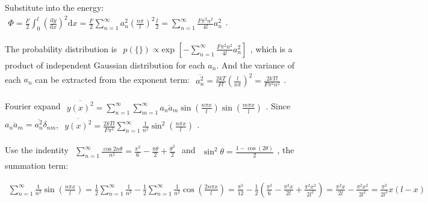 \documentclass[../../main.tex]{subfiles}
\begin{document}
  Substitute into the energy: $\begin{aligned}
    \Phi = \frac{F}{2}\int_{0}^{l}\left(\frac{\mathrm{d}y}{\mathrm{d}x}\right)^{2}\mathrm{d}x = \frac{F}{2}\sum_{n=1}^{\infty}a_{n}^{2}\left(\frac{n\pi}{l}\right)^{2}\frac{l}{2} = \sum_{n=1}^{\infty}\frac{F\pi^{2}n^{2}}{4l}a_{n}^{2}
  \end{aligned}$.

  The probability distribution is $\begin{aligned}
    p(\{\}) \propto \text{exp }\left[-\sum_{n=1}^{\infty}\frac{F\pi^{2}n^{2}}{4l}a_{n}^{2}\right]
  \end{aligned}$, which is a product of independent Gaussian distribution for each $a_{n}$. And the variance of each $a_{n}$ can be extracted from the exponent term: $\begin{aligned}
    \overline{a_{n}^{2}} = \frac{2kT}{Fl}\left(\frac{l}{n\pi}\right)^{2} = \frac{2kTl}{F\pi^{2}n^{2}}
  \end{aligned}$.

  Fourier expand $\begin{aligned}
    \overline{y(x)^{2}} = \sum_{n=1}^{\infty}\sum_{m=1}^{\infty}\overline{a_{n}a_{m}}\sin{\left(\frac{n\pi x}{l}\right)}\sin{\left(\frac{m\pi x}{l}\right)}
  \end{aligned}$. Since $\overline{a_{n}a_{m}} = \overline{a_{n}^{2}}\delta_{nm}$, $\begin{aligned}
    \overline{y(x)^{2}} = \frac{2kTl}{F\pi^{2}}\sum_{n=1}^{\infty}\frac{1}{n^{2}}\sin^{2}{\left(\frac{n\pi x}{l}\right)}
  \end{aligned}$. 

  Use the indentity $\begin{aligned}
    \sum_{n=1}^{\infty}\frac{\cos{2n\theta}}{n^{2}} = \frac{\pi^{2}}{6} - \frac{\pi\theta}{2} + \frac{\theta^{2}}{2}
  \end{aligned}$ and $\begin{aligned}
    \sin^{2}{\theta} = \frac{1-\cos{(2\theta)}}{2}
  \end{aligned}$, the summation term: 
  
  $\begin{aligned}
    \sum_{n=1}^{\infty}\frac{1}{n^{2}}\sin{\left(\frac{n\pi x}{l}\right)} = \frac{1}{2}\sum_{n=1}^{\infty}\frac{1}{n^{2}} - \frac{1}{2}\sum_{n=1}^{\infty}\frac{1}{n^{2}}\cos{\left(\frac{2n\pi x}{l}\right)} = \frac{\pi^{2}}{12} - \frac{1}{2}\left(
      \frac{\pi^{2}}{6} - \frac{\pi^{2}x}{2l} + \frac{\pi^{2}x^{2}}{2l^{2}}
    \right) = \frac{\pi^{2}x}{2l} - \frac{\pi^{2}x^{2}}{2l^{2}} = \frac{\pi^{2}}{2l^{2}}x(l-x)
  \end{aligned}$
\end{document}
